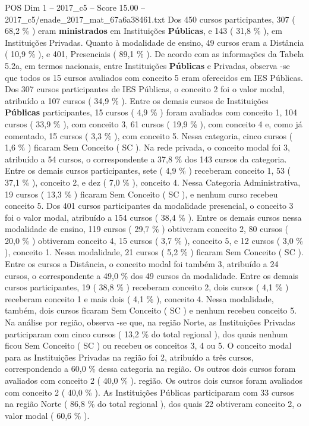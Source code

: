 \begin{textsample}{POS Dim 1 – 2017\_c5 – Score 15.00 – 2017\_c5/enade\_2017\_mat\_67a6a38461.txt}
Dos 450 cursos participantes, 307 ( 68,2 \% ) eram \textbf{ministrados} em Instituições \textbf{Públicas}, e 143 ( 31,8 \% ), em Instituições Privadas.
Quanto à modalidade de ensino, 49 cursos eram a Distância ( 10,9 \% ), e 401, Presenciais ( 89,1 \% ).
De acordo com as informações da Tabela 5.2a, em termos nacionais, entre Instituições \textbf{Públicas} e Privadas, observa -se que todos os 15 cursos avaliados com conceito 5 eram oferecidos em IES Públicas.
Dos 307 cursos participantes de IES Públicas, o conceito 2 foi o valor modal, atribuído a 107 cursos ( 34,9 \% ).
Entre os demais cursos de Instituições \textbf{Públicas} participantes, 15 cursos ( 4,9 \% ) foram avaliados com conceito 1, 104 cursos ( 33,9 \% ), com conceito 3, 61 cursos ( 19,9 \% ), com conceito 4 e, como já comentado, 15 cursos ( 3,3 \% ), com conceito 5.
Nessa categoria, cinco cursos ( 1,6 \% ) ficaram Sem Conceito ( SC ).
Na rede privada, o conceito modal foi 3, atribuído a 54 cursos, o correspondente a 37,8 \% dos 143 cursos da categoria.
Entre os demais cursos participantes, sete ( 4,9 \% ) receberam conceito 1, 53 ( 37,1 \% ), conceito 2, e dez ( 7,0 \% ), conceito 4.
Nessa Categoria Administrativa, 19 cursos ( 13,3 \% ) ficaram Sem Conceito ( SC ), e nenhum curso recebeu conceito 5.
Dos 401 cursos participantes da modalidade presencial, o conceito 3 foi o valor modal, atribuído a 154 cursos ( 38,4 \% ).
Entre os demais cursos nessa modalidade de ensino, 119 cursos ( 29,7 \% ) obtiveram conceito 2, 80 cursos ( 20,0 \% ) obtiveram conceito 4, 15 cursos ( 3,7 \% ), conceito 5, e 12 cursos ( 3,0 \% ), conceito 1.
Nessa modalidade, 21 cursos ( 5,2 \% ) ficaram Sem Conceito ( SC ).
Entre os cursos a Distância, o conceito modal foi também 3, atribuído a 24 cursos, o correspondente a 49,0 \% dos 49 cursos da modalidade.
Entre os demais cursos participantes, 19 ( 38,8 \% ) receberam conceito 2, dois cursos ( 4,1 \% ) receberam conceito 1 e mais dois ( 4,1 \% ), conceito 4.
Nessa modalidade, também, dois cursos ficaram Sem Conceito ( SC ) e nenhum recebeu conceito 5.
Na análise por região, observa -se que, na região Norte, as Instituições Privadas participaram com cinco cursos ( 13,2 \% do total regional ), dos quais nenhum ficou Sem Conceito ( SC ) ou recebeu os conceitos 3, 4 ou 5.
O conceito modal para as Instituições Privadas na região foi 2, atribuído a três cursos, correspondendo a 60,0 \% dessa categoria na região.
Os outros dois cursos foram avaliados com conceito 2 ( 40,0 \% ). região.
Os outros dois cursos foram avaliados com conceito 2 ( 40,0 \% ).
As Instituições Públicas participaram com 33 cursos na região Norte ( 86,8 \% do total regional ), dos quais 22 obtiveram conceito 2, o valor modal ( 60,6 \% ).

\end{textsample}
